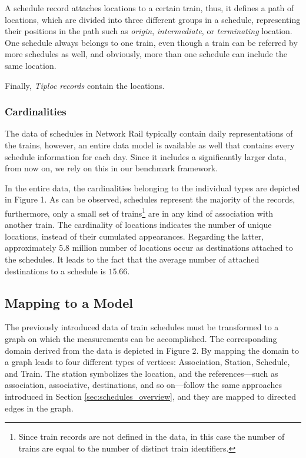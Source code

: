 A schedule record attaches locations to a certain train, thus, it defines a path of locations, which are divided into three different groups in a schedule, representing their positions in the path such as \textit{origin}, \textit{intermediate}, or \textit{terminating} location. One schedule always belongs to one train, even though a train can be referred by more schedules as well, and obviously, more than one schedule can include the same location.

Finally, \textit{Tiploc records} contain the locations.

\subsubsection{Cardinalities}

The data of schedules in Network Rail typically contain daily representations of the trains, however, an entire data model is available as well that contains every schedule information for each day. Since it includes a significantly larger data, from now on, we rely on this in our benchmark framework.

In the entire data, the cardinalities belonging to the individual types are depicted in Figure 1. %
As can be observed, schedules represent the majority of the records, furthermore, only a small set of trains\footnote{Since train records are not defined in the data, in this case the number of trains are equal to the number of distinct train identifiers.} are in any kind of association with another train. The cardinality of locations indicates the number of unique locations, instead of their cumulated appearances. Regarding the latter, approximately 5.8 million number of locations occur as destinations attached to the schedules. It leads to the fact that the average number of attached destinations to a schedule is $15.66$.

\subsection{Mapping to a Model}\label{sec:mapping_schedule}

The previously introduced data of train schedules must be transformed to a graph on which the measurements can be accomplished. The corresponding domain derived from the data is depicted in Figure 2. %
By mapping the domain to a graph leads to four different types of vertices: \textsf{Association}, \textsf{Station}, \textsf{Schedule}, and \textsf{Train}. The station symbolizes the location, and the references---such as \textsf{association}, \textsf{associative}, \textsf{destinations}, and so on---follow the same approaches introduced in Section \ref{sec:schedules_overview}, and they are mapped to directed edges in the graph. 

